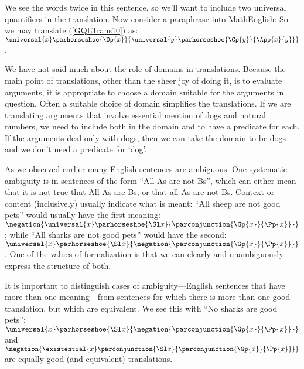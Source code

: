 \noindent{}We see the words  twice in this sentence, so we'll want to include two universal quantifiers in the translation.  Now consider a paraphrase into MathEnglish:   So we may translate (\ref{GQLTrans10}) as: $\universal{\variable{x}}\parhorseshoe{\Dp{\variable{x}}}{\universal{\variable{y}}\parhorseshoe{\Cp{\variable{y}}}{\App{\variable{x}}{\variable{y}}}}$.

We have not said much about the role of domains in translations.  Because the main point of translations, other than the sheer joy of doing it, is to evaluate arguments, it is appropriate to choose a domain suitable for the arguments in question.  Often a suitable choice of domain simplifies the translations.  If we are translating arguments that involve essential mention of dogs and natural numbers, we need to include both in the domain and to have a predicate for each.  If the arguments deal only with dogs, then we can take the domain to be dogs and we don’t need a predicate for `dog'.

As we observed earlier many English sentences are ambiguous.  One systematic ambiguity is in sentences of the form ``All As are not Bs'', which can either mean that it is not true that All As are Bs, or that all As are not-Bs.  Context or content (inclusively) usually indicate what is meant:  ``All sheep are not good pets'' would usually have the first meaning: $\negation{\universal{\variable{x}}\parhorseshoe{\Sl\variable{x}}{\parconjunction{\Gp{\variable{x}}}{\Pp{\variable{x}}}}}$; while ``All sharks are not good pets'' would have the second: $\universal{\variable{x}}\parhorseshoe{\Sl\variable{x}}{\negation{\parconjunction{\Gp{\variable{x}}}{\Pp{\variable{x}}}}}$.  One of the values of formalization is that we can clearly and unambiguously express the structure of both.

It is important to distinguish cases of ambiguity---English sentences that  have more than one meaning---from sentences for which there is more than one good translation, but which are equivalent.  We see this with ``No sharks are good pets'': $\universal{\variable{x}}\parhorseshoe{\Sl\variable{x}}{\negation{\parconjunction{\Gp{\variable{x}}}{\Pp{\variable{x}}}}}$ and $\negation{\existential{\variable{x}}\parconjunction{\Sl\variable{x}}{\parconjunction{\Gp{\variable{x}}}{\Pp{\variable{x}}}}}$ are equally good (and equivalent) translations.

